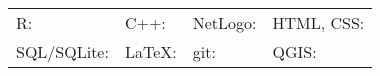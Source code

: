 \documentclass[hidelinks]{report}
\begin{document}
\begin{center}
	\begin{tabular}{l l l l}
		
		R: \textcolor{green}{\faCircle \faCircle \faCircle \faCircle \faCircle} & 
		C++: \textcolor{green}{\faCircle \faCircle \faCircle \faCircleO \faCircleO} & 
		NetLogo: \textcolor{green}{\faCircle \faCircle \faCircleO \faCircleO \faCircleO} &
		HTML, CSS: \textcolor{green}{\faCircle \faCircleO \faCircleO \faCircleO \faCircleO} \\
	
		SQL/SQLite: \textcolor{green}{\faCircle \faCircleO \faCircleO \faCircleO \faCircleO} &
		LaTeX: \textcolor{green}{\faCircle \faCircle \faCircle \faCircleO \faCircleO} &
		git: \textcolor{green}{\faCircle \faCircle \faCircle \faCircleO \faCircleO} &
		QGIS: \textcolor{green}{\faCircle \faCircle \faCircleO \faCircleO \faCircleO} \\

	\end{tabular}
\end{center}
\end{document}
